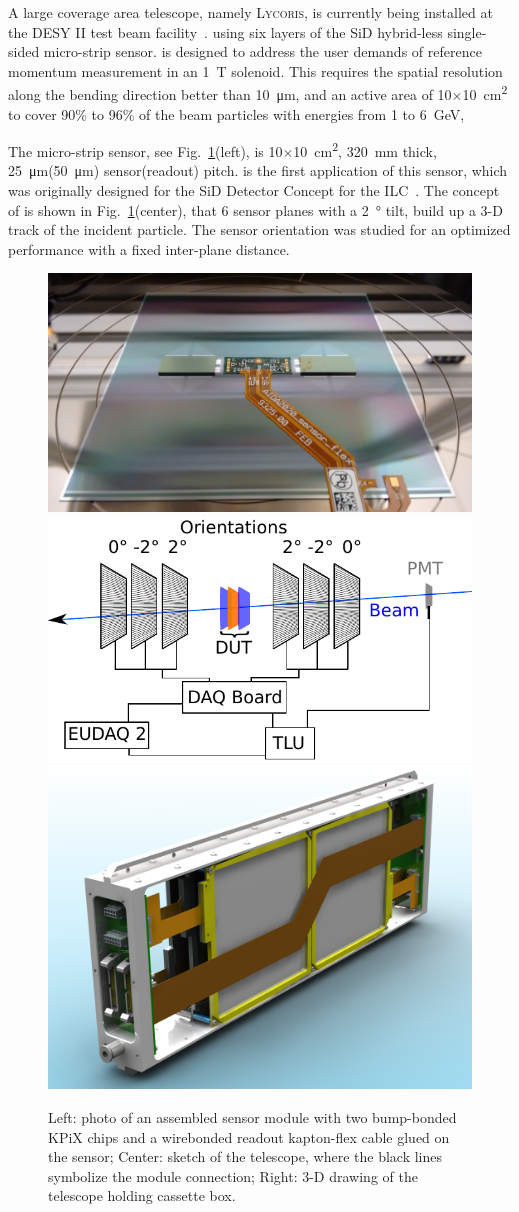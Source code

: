 A large coverage area telescope, namely \textsc{Lycoris}, is currently being installed at the DESY II test beam facility~\cite{desytbf}.
using six layers of the SiD hybrid-less single-sided micro-strip sensor.
\lycoris is designed to address the user demands of reference momentum measurement in an \SI{1}{\tesla} solenoid.
This requires the spatial resolution along the bending direction better than \SI{10}{\micro\metre},
and an active area of 10$\times$\SI{10}{\square\centi\metre} to cover 90\% to 96\% of the beam particles with energies from 1 to \SI{6}{\GeV},

The micro-strip sensor, see Fig.~\ref{fig:1figs}(left),
is 10$\times$\SI{10}{\square\centi\metre}, \SI{320}{\milli\metre} thick, \SI{25}{\micro\metre}(\SI{50}{\micro\metre}) sensor(readout) pitch.
\lycoris is the first application of this sensor, which was originally designed for the SiD Detector Concept for the ILC~\cite{ILC-2013TDR:det}.
The concept of \lycoris is shown in Fig.~\ref{fig:1figs}(center),
that 6 sensor planes with a \SI{2}{\degree} tilt, build up a 3-D track of the incident particle.
The sensor orientation was studied for an optimized performance with a fixed inter-plane distance.


\begin{figure}[!ht]%
\centering
\includegraphics[width=0.33\linewidth]{pics/sensor_module1.jpg}%
\includegraphics[width=0.33\linewidth]{pics/principle.pdf}%
\includegraphics[width=0.33\linewidth]{pics/Si-TrackerHD}
\caption{
Left: photo of an assembled sensor module with two bump-bonded KPiX chips and a wirebonded readout kapton-flex cable glued on the sensor;
Center: sketch of the \lycoris telescope, where the black lines symbolize the module connection;
Right: 3-D drawing of the telescope holding cassette box.
}%
\label{fig:1figs}%
\end{figure}

